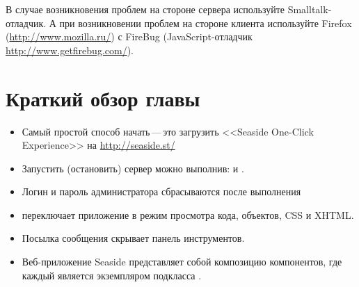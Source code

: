\documentclass[a4paper,10pt,twoside]{book}
\begin{document}
В случае возникновения проблем на стороне сервера используйте
Smalltalk-отладчик. А при возникновении проблем на стороне клиента
используйте Firefox (\url{http://www.mozilla.ru/}) с FireBug (JavaScript-отладчик
\url{http://www.getfirebug.com/}). 


\section{Краткий обзор главы}

\begin{itemize}
\item Самый простой способ начать\,---\,это загрузить <<Seaside One-Click
Experience>> на \url{http://seaside.st/} 
\item Запустить (остановить) сервер можно выполнив:
 и .
\item Логин и пароль администратора сбрасываются после выполнения 
\item {} переключает приложение в режим просмотра
кода, объектов, CSS и XHTML.
\item Посылка сообщения 
скрывает панель инструментов.
\item Веб-приложение Seaside представляет собой композицию компонентов,
где каждый является экземпляром подкласса .

\end{itemize}
\end{document}
